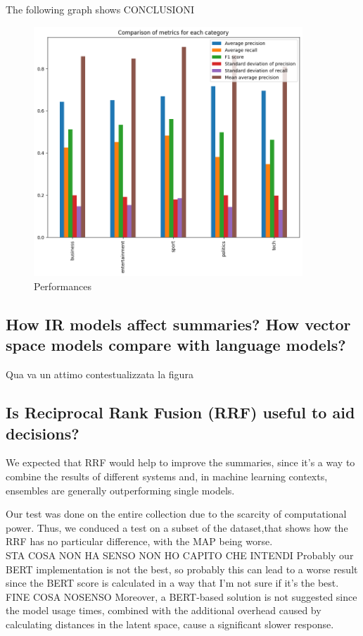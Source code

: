 The following graph shows CONCLUSIONI
\begin{figure}[h]
    \centering
    \includegraphics[width=0.9\textwidth]{images/class_comparison.png}
    \caption{Performances}
    \label{fig:Performances}
\end{figure}


\subsection{How IR models affect summaries? How vector space models compare with language models?}
Qua va un attimo contestualizzata la figura
\subsection{Is Reciprocal Rank Fusion (RRF) useful to aid decisions?}
We expected that RRF would help to improve the summaries, since it's a way to combine the results of different systems and, in machine learning contexts, ensembles are generally outperforming single models. 

Our test was done on the entire collection due to the scarcity of computational power. Thus, we conduced a test on a subset of the dataset,that shows how the RRF has no particular difference, with the MAP being worse.
\\ STA COSA NON HA SENSO NON HO CAPITO CHE INTENDI
Probably our BERT implementation is not the best, so probably this can lead to a worse result since the BERT score is calculated in a way that I'm not sure if it's the best.
\\FINE COSA NOSENSO
Moreover, a BERT-based solution is not suggested since the model usage times, combined with the additional overhead caused by calculating distances in the latent space, cause a significant slower response.

